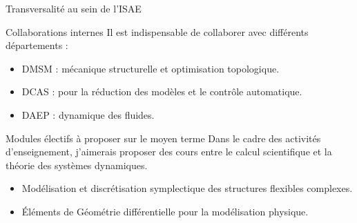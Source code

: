 \documentclass[aspectratio=169, french]{ISAE-Beamer}
\begin{document}
\begin{frame}{Transversalité au sein de l'ISAE}


	\begin{block}{Collaborations internes}
		Il est indispensable de collaborer avec différents départements :
		\begin{itemize}
			\item DMSM : mécanique structurelle et optimisation topologique. 
			\item DCAS : pour la réduction des modèles et le contrôle automatique.
			\item DAEP : dynamique des fluides.
		\end{itemize}
	\end{block}

\end{frame}


\begin{frame}{Modules électifs à proposer sur le moyen terme}
Dans le cadre des activités d'enseignement, j'aimerais proposer des cours entre le calcul scientifique et la théorie des systèmes dynamiques.
\begin{itemize}
	\item Modélisation et discrétisation symplectique des structures flexibles complexes.
	\item Éléments de Géométrie différentielle pour la modélisation physique.
\end{itemize}
\end{frame}
	





	
	

\end{document}
